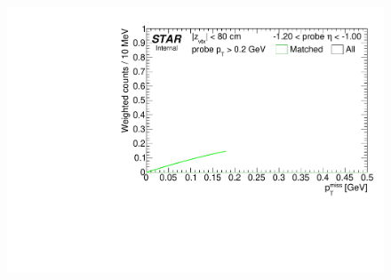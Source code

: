 \begin{figure}[h!]
{}~
\parbox{0.24\textwidth}{
  \centering
  \includegraphics[width=\linewidth,page=4]{graphics/correctionsToEff/TOF_tagAndProbe/Fitting_effVsEta_mc.CPT2.pdf}%
}
\end{figure}
